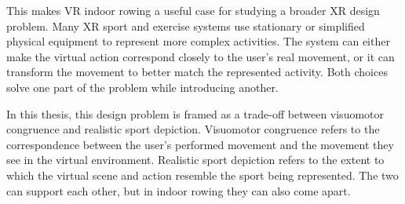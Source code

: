 %
%




This makes VR indoor rowing a useful case for studying a broader XR design problem. Many XR sport and exercise systems use stationary or simplified physical equipment to represent more complex activities. The system can either make the virtual action correspond closely to the user's real movement, or it can transform the movement to better match the represented activity. Both choices solve one part of the problem while introducing another.

In this thesis, this design problem is framed as a trade-off between visuomotor congruence and realistic sport depiction. Visuomotor congruence refers to the correspondence between the user's performed movement and the movement they see in the virtual environment. Realistic sport depiction refers to the extent to which the virtual scene and action resemble the sport being represented. The two can support each other, but in indoor rowing they can also come apart.

